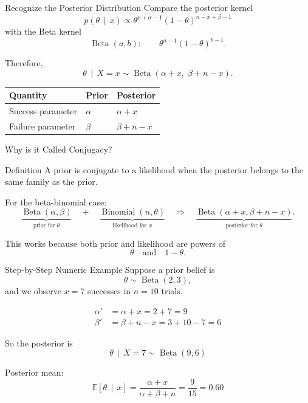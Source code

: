 \documentclass[aspectratio=43,11pt]{beamer}
\newcommand{\E}{\mathbb{E}}
\newcommand{\BetaDist}{\operatorname{Beta}}
\newcommand{\Bin}{\operatorname{Binomial}}
\newcommand{\given}{\,\mid\,}
\begin{document}
  \begin{frame}{Recognize the Posterior Distribution}
    Compare the posterior kernel
    \[
    p(\theta \given x) \propto
    \theta^{x+\alpha-1}(1-\theta)^{n-x+\beta-1}
    \]
    with the Beta kernel
    \[
    \BetaDist(a,b): \qquad \theta^{a-1}(1-\theta)^{b-1}.
    \]

    Therefore,
    \[
    \boxed{\theta \given X=x \sim \BetaDist(\alpha+x,\; \beta+n-x)}.
    \]

    \begin{center}
      \begin{tabular}{lll}
        \toprule
        Quantity & Prior & Posterior \\
        \midrule
        Success parameter & $\alpha$ & $\alpha+x$ \\
        Failure parameter & $\beta$ & $\beta+n-x$ \\
        \bottomrule
      \end{tabular}
    \end{center}
  \end{frame}

  \begin{frame}{Why is it Called Conjugacy?}
    \begin{block}{Definition}
      A prior is \alert{conjugate} to a likelihood when the posterior belongs to the same family as the prior.
    \end{block}

    For the beta-binomial case:
    \[
    \underbrace{\BetaDist(\alpha,\beta)}_{\text{prior for }\theta}
    \quad + \quad
    \underbrace{\Bin(n,\theta)}_{\text{likelihood for }x}
    \quad \Longrightarrow \quad
    \underbrace{\BetaDist(\alpha+x,\beta+n-x)}_{\text{posterior for }\theta}.
    \]

    \vspace{0.25cm}
    This works because both prior and likelihood are powers of
    \[
    \theta \quad \text{and} \quad 1-\theta.
    \]
  \end{frame}

  \begin{frame}{Step-by-Step Numeric Example}
    \small
    Suppose a prior belief is
    \[
    \theta \sim \BetaDist(2,3),
    \]
    and we observe $x=7$ successes in $n=10$ trials.

    \begin{align*}
      \alpha' &= \alpha+x = 2+7 = 9\\
      \beta'  &= \beta+n-x = 3+10-7 = 6
    \end{align*}

    So the posterior is
    \[
    \boxed{\theta \given X=7 \sim \BetaDist(9,6)}
    \]

    Posterior mean:
    \[
    \E[\theta \given x] = \frac{\alpha+x}{\alpha+\beta+n}
    = \frac{9}{15}=0.60
    \]
  \end{frame}
\end{document}
